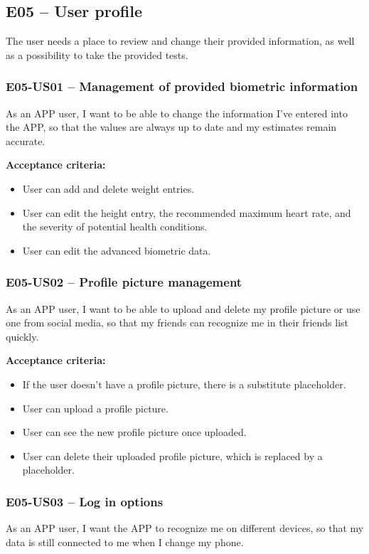 
\subsection*{E05 -- User profile}
The user needs a place to review and change their provided information, as well as a possibility to take the provided tests.

\subsubsection*{E05-US01 -- Management of provided biometric information}
As an APP user, I want to be able to change the information I've entered into the APP, so that the values are always up to date and my estimates remain accurate.

\textbf{Acceptance criteria:}
\begin{itemize}
    \item User can add and delete weight entries.
    \item User can edit the height entry, the recommended maximum heart rate, and the severity of potential health conditions.
    \item User can edit the advanced biometric data.
\end{itemize}

\subsubsection*{E05-US02 -- Profile picture management}
As an APP user, I want to be able to upload and delete my profile picture or use one from social media, so that my friends can recognize me in their friends list quickly.

\textbf{Acceptance criteria:}
\begin{itemize}
    \item If the user doesn't have a profile picture, there is a substitute placeholder.
    \item User can upload a profile picture.
    \item User can see the new profile picture once uploaded.
    \item User can delete their uploaded profile picture, which is replaced by a placeholder.
\end{itemize}

\subsubsection*{E05-US03 -- Log in options}
As an APP user, I want the APP to recognize me on different devices, so that my data is still connected to me when I change my phone.

